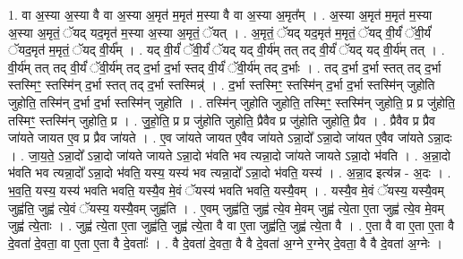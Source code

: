 \documentclass[17pt]{extarticle}
\begin{document}
1. वा अ॒स्या अ॒स्या वै वा अ॒स्या अ॒मृत॑ म॒मृत॑ म॒स्या वै वा अ॒स्या अ॒मृत᳚म् । . अ॒स्या अ॒मृत॑ म॒मृत॑ म॒स्या अ॒स्या अ॒मृतं॒ ॅयद् यद॒मृत॑ म॒स्या अ॒स्या अ॒मृतं॒ ॅयत् । . अ॒मृतं॒ ॅयद् यद॒मृत॑ म॒मृतं॒ ॅयद् वी॒र्यं॑ ॅवी॒र्यं॑ ॅयद॒मृत॑ म॒मृतं॒ ॅयद् वी॒र्य᳚म् । . यद् वी॒र्यं॑ ॅवी॒र्यं॑ ॅयद् यद् वी॒र्य॑म् तत् तद् वी॒र्यं॑ ॅयद् यद् वी॒र्य॑म् तत् । . वी॒र्य॑म् तत् तद् वी॒र्यं॑ ॅवी॒र्य॑म् तद् द॒र्भा द॒र्भा स्तद् वी॒र्यं॑ ॅवी॒र्य॑म् तद् द॒र्भाः । . तद् द॒र्भा द॒र्भा स्तत् तद् द॒र्भा स्तस्मिꣳ॒॒ स्तस्मि॑न् द॒र्भा स्तत् तद् द॒र्भा स्तस्मिन्न्॑ । . द॒र्भा स्तस्मिꣳ॒॒ स्तस्मि॑न् द॒र्भा द॒र्भा स्तस्मि॑न् जुहोति जुहोति॒ तस्मि॑न् द॒र्भा द॒र्भा स्तस्मि॑न् जुहोति । . तस्मि॑न् जुहोति जुहोति॒ तस्मिꣳ॒॒ स्तस्मि॑न् जुहोति॒ प्र प्र जु॑होति॒ तस्मिꣳ॒॒ स्तस्मि॑न् जुहोति॒ प्र । . जु॒हो॒ति॒ प्र प्र जु॑होति जुहोति॒ प्रैवैव प्र जु॑होति जुहोति॒ प्रैव । . प्रैवैव प्र प्रैव जा॑यते जायत ए॒व प्र प्रैव जा॑यते । . ए॒व जा॑यते जायत ए॒वैव जा॑यते ऽन्ना॒दो᳚ ऽन्ना॒दो जा॑यत ए॒वैव जा॑यते ऽन्ना॒दः । . जा॒य॒ते॒ ऽन्ना॒दो᳚ ऽन्ना॒दो जा॑यते जायते ऽन्ना॒दो भ॑वति भव त्यन्ना॒दो जा॑यते जायते ऽन्ना॒दो भ॑वति । . अ॒न्ना॒दो भ॑वति भव त्यन्ना॒दो᳚ ऽन्ना॒दो भ॑वति॒ यस्य॒ यस्य॑ भव त्यन्ना॒दो᳚ ऽन्ना॒दो भ॑वति॒ यस्य॑ । . अ॒न्ना॒द इत्य॑न्न - अ॒दः । . भ॒व॒ति॒ यस्य॒ यस्य॑ भवति भवति॒ यस्यै॒व मे॒वं ॅयस्य॑ भवति भवति॒ यस्यै॒वम् । . यस्यै॒व मे॒वं ॅयस्य॒ यस्यै॒वम् जुह्व॑ति॒ जुह्व॑ त्ये॒वं ॅयस्य॒ यस्यै॒वम् जुह्व॑ति । . ए॒वम् जुह्व॑ति॒ जुह्व॑ त्ये॒व मे॒वम् जुह्व॑ त्ये॒ता ए॒ता जुह्व॑ त्ये॒व मे॒वम् जुह्व॑ त्ये॒ताः । . जुह्व॑ त्ये॒ता ए॒ता जुह्व॑ति॒ जुह्व॑ त्ये॒ता वै वा ए॒ता जुह्व॑ति॒ जुह्व॑ त्ये॒ता वै । . ए॒ता वै वा ए॒ता ए॒ता वै दे॒वता॑ दे॒वता॒ वा ए॒ता ए॒ता वै दे॒वताः᳚ । . वै दे॒वता॑ दे॒वता॒ वै वै दे॒वता॑ अ॒ग्ने र॒ग्नेर् दे॒वता॒ वै वै दे॒वता॑ अ॒ग्नेः । \newline
\end{document}
